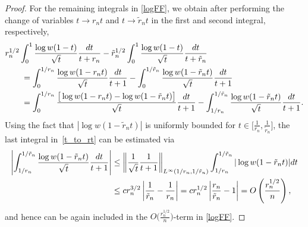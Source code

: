 \documentclass[11pt]{article}
\numberwithin{equation}{section}
\numberwithin{equation}{section}
\begin{document}
\begin{proof}
For the remaining integrals in \eqref{logFF}, we obtain after performing the change of variables $t \to r_n t$ and $t \to \tilde r_n t$ in the first and second integral, respectively,
\begin{align}\nonumber
 &r_n^{1/2}\int_0^1 \frac{\log w(1-t)}{\sqrt{t}} \frac{{\rm d}t}{t+r_n} - \tilde r_n^{1/2} \int_0^1 \frac{\log w(1-t)}{\sqrt{t}} \frac{{\rm d}t}{t+\tilde r_n}
 \\
 &\qquad= \int_0^{1/r_n} \frac{\log w(1-r_n t)}{\sqrt{t}} \frac{{\rm d}t}{t+1} - \int_0^{1/\tilde r_n} \frac{\log w(1-\tilde r_n t)}{\sqrt{t}} \frac{{\rm d}t}{t+1}\nonumber
 \\
&\qquad = \int_0^{1/r_n}\frac{\big[\log w(1-r_n t) - \log w(1-\tilde r_n t)\big]}{\sqrt{t}} \frac{{\rm d}t}{t+1}-\int_{1/ r_n}^{1/\tilde r_n} \frac{\log w(1-\tilde r_n t)}{\sqrt{t}} \frac{{\rm d}t}{t+1}.\label{t_to_rt}
\end{align}
Using the fact that $|\log w(1-\tilde r_n t)|$ is uniformly bounded for $t \in \big[\frac{1}{r_n}, \frac{1}{\tilde r_n}\big]$, the last integral in~\eqref{t_to_rt} can be estimated via
\begin{align*}
 \left| \int_{1/r_n}^{1/\tilde r_n} \frac{\log w(1-\tilde r_n t)}{\sqrt{t}} \frac{{\rm d}t}{t+1} \right| &\leq \left \Vert \frac{1}{\sqrt{t}} \frac{1}{t+1} \right \Vert_{L^\infty(1/r_n, 1/\tilde r_n)} \int_{1/ r_n}^{1/\tilde r_n} |\log w(1-\tilde r_n t)| {\rm d}t \\
 &\leq c r_n^{3/2} \left| \frac{1}{\tilde r_n} - \frac{1}{r_n}\right| = c r_n^{1/2} \left| \frac{r_n}{\tilde r_n}-1\right| = O\left(\frac{r_n^{1/2}}{n}\right),
\end{align*}
and hence can be again included in the $O\big(\frac{r_n^{1/2}}{ n}\big)$-term in \eqref{logFF}.


\end{proof}
\end{document}
